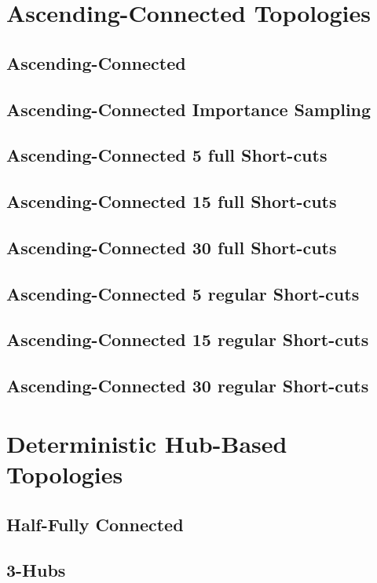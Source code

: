 \documentclass[Bachelorarbeit.tex]{subfiles}
\begin{document}
\section{Ascending-Connected Topologies} 

\subsection{Ascending-Connected}

\subsection{Ascending-Connected Importance Sampling}

\subsection{Ascending-Connected 5 full Short-cuts }
\subsection{Ascending-Connected 15 full Short-cuts }
\subsection{Ascending-Connected 30 full Short-cuts }

\subsection{Ascending-Connected 5 regular Short-cuts }
\subsection{Ascending-Connected 15 regular Short-cuts }
\subsection{Ascending-Connected 30 regular Short-cuts }



\section{Deterministic Hub-Based Topologies} 

\subsection{Half-Fully Connected}
\subsection{3-Hubs}
\end{document}
